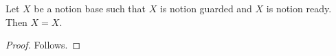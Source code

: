 

\begin{proposition}\label{notion_completed_circular}
    Let $X$ be a notion base such that
        $X$ is notion guarded and $X$ is notion ready.
    Then $X=X$.
\end{proposition}
\begin{proof}
    Follows.
\end{proof}

